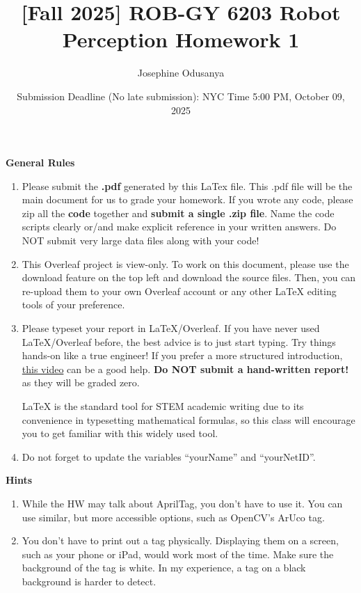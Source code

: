 \documentclass[english]{article}
\newcommand{\yourName}{Josephine Odusanya}
\newcommand{\yourNetID}{joo9964}
\begin{document}
 
\rfoot{Name: \yourName, netID: \yourNetID}
\title{\textbf{[Fall 2025] ROB-GY 6203 Robot Perception Homework 1}}
\author{\yourName}
\pagestyle{fancy}
\date{Submission Deadline (No late submission): NYC Time 5:00 PM, October 09, 2025}

\maketitle
\textbf{General Rules}

\begin{enumerate}
    \item Please submit the \textbf{.pdf} generated by this LaTex file. This .pdf file will be the main document for us to grade your homework. If you wrote any code, please zip all the \textbf{code} together and \textbf{submit a single .zip file}. Name the code scripts clearly or/and make explicit reference in your written answers. Do NOT submit very large data files along with your code!
    \item This Overleaf project is view-only. To work on this document, please use the download feature on the top left and download the source files. Then, you can re-upload them to your own Overleaf account or any other LaTeX editing tools of your preference.
    \item Please typeset your report in LaTeX/Overleaf. If you have never used LaTeX/Overleaf before, the best advice is to just start typing. Try things hands-on like a true engineer! If you prefer a more structured introduction, \hyperlink{https://www.youtube.com/watch?v=ydOTMQC7np0}{this video} can be a good help. \textbf{Do NOT submit a hand-written report!} as they will be graded zero. 
    
    LaTeX is the standard tool for STEM academic writing due to its convenience in typesetting mathematical formulas, so this class will encourage you to get familiar with this widely used tool.
    \item Do not forget to update the variables ``yourName'' and ``yourNetID''.
\end{enumerate}


\textbf{Hints}
\begin{enumerate}
    \item While the HW may talk about AprilTag, you don't have to use it. You can use similar, but more accessible options, such as OpenCV's ArUco tag.
    \item You don't have to print out a tag physically. Displaying them on a screen, such as your phone or iPad, would work most of the time. Make sure the background of the tag is white. In my experience, a tag on a black background is harder to detect.
\end{enumerate}
\end{document}
